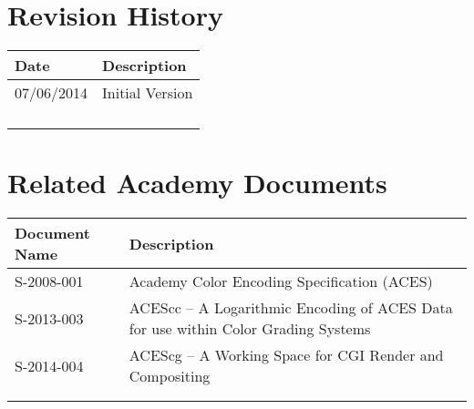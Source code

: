 \prelimsectionformat	%
\chapter{Revision History}

\begin{tabularx}{\linewidth}{|l|X|}
    \hline
    Date & Description \\ \hline
    07/06/2014 & Initial Version      \\ \hline
          &             \\ \hline
          &             \\ \hline
          &             \\ \hline
          &             \\ \hline
\end{tabularx}

\vspace{0.25in} %
\chapter{Related Academy Documents} %
\begin{tabularx}{\linewidth}{|l|X|}
    \hline
    Document Name & Description  \\ \hline
    S-2008-001 & Academy Color Encoding Specification (ACES) \\ \hline
    S-2013-003 & ACEScc -- A Logarithmic Encoding of ACES Data for use within Color Grading Systems \\ \hline
    S-2014-004 & ACEScg -- A Working Space for CGI Render and Compositing             \\ \hline
    & \\ \hline
    & \\ \hline
\end{tabularx}
